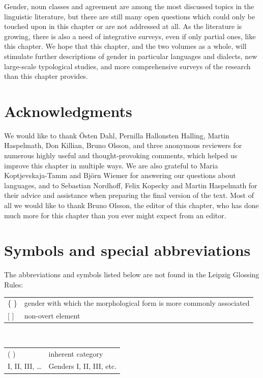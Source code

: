 \documentclass[output=collectionpaper]{langsci/langscibook}
\begin{document}
Gender, noun classes and agreement are among the most discussed topics in the linguistic literature, but there are still many open questions which could only be touched upon in this chapter or are not addressed at all. As the literature is growing, there is also a need of integrative surveys, even if only partial ones, like this chapter. We hope that this chapter, and the two volumes as a whole, will stimulate further descriptions of gender in particular languages and dialects, new large-scale typological studies, and more comprehensive surveys of the research than this chapter provides.

\section*{Acknowledgments}
We would like to thank Östen Dahl, Pernilla Hallonsten Halling, Martin Haspelmath, Don Killian, Bruno Olsson, and three anonymous reviewers for numerous highly useful and thought-provoking comments, which helped us improve this chapter in multiple ways. We are also grateful to Maria Koptjevskaja-Tamm and Björn Wiemer for answering our questions about  languages, and to Sebastian Nordhoff, Felix Kopecky and Martin Haspelmath for their advice and assistance when preparing the final version of the text. Most of all we would like to thank Bruno Olsson, the editor of this chapter, who has done much more for this chapter than you ever might expect from an editor.

\section*{Symbols and special abbreviations}

\noindent The abbreviations and symbols listed below are not found in the Leipzig Glossing Rules:
\medskip

\noindent
\begin{tabularx}{\textwidth}{lX}
  \{ \}	&	gender with which the morphological form is more commonly associated	\\
{[} {]}	&	non-overt element	\\
\end{tabularx}\\
\begin{tabularx}{\textwidth}{lX}
( )	&	inherent category	\\
I, II, III, \ldots	&	Genders I, II, III, etc.\\
\end{tabularx}
\end{document}
